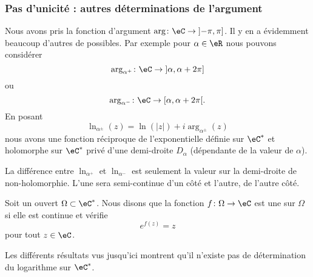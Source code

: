 \subsubsection{Pas d'unicité : autres déterminations de l'argument}

\begin{normaltext}      \label{NORMooFCDOooFDzAjp}
    Nous avons pris la fonction d'argument \( \arg\colon \eC\to \mathopen] -\pi , \pi \mathclose]\). Il y en a évidemment beaucoup d'autres de possibles. Par exemple pour \( \alpha\in \eR\) nous pouvons considérer
    \begin{equation}
        \arg_{\alpha^+}\colon \eC\to \mathopen] \alpha , \alpha+2\pi \mathclose]
    \end{equation}
    ou
    \begin{equation}
        \arg_{\alpha^-}\colon \eC\to \mathopen[ \alpha , \alpha+2\pi \mathclose[.
    \end{equation}
    En posant
    \begin{equation}
        \ln_{\alpha^{\pm}}(z)=\ln(| z |)+i\arg_{\alpha^{\pm}}(z)
    \end{equation}
nous avons une fonction réciproque de l'exponentielle définie sur \( \eC^*\) et holomorphe sur \( \eC^*\) privé d'une demi-droite \( D_{\alpha}\) (dépendante de la valeur de \( \alpha\)).
\end{normaltext}

La différence entre \( \ln_{\alpha^+}\) et \( \ln_{\alpha^-}\) est seulement la valeur sur la demi-droite de non-holomorphie. L'une sera semi-continue d'un côté et l'autre, de l'autre côté.

\begin{definition}
    Soit un ouvert \( \Omega\subset \eC^*\). Nous disons que la fonction \( f\colon \Omega\to \eC\) est une  sur \( \Omega\) si elle est continue et vérifie
    \begin{equation}
        e^{f(z)}=z
    \end{equation}
    pour tout \( z\in \eC\).
\end{definition}

Les différents résultats vus jusqu'ici montrent qu'il n'existe pas de détermination du logarithme sur \( \eC^*\).

